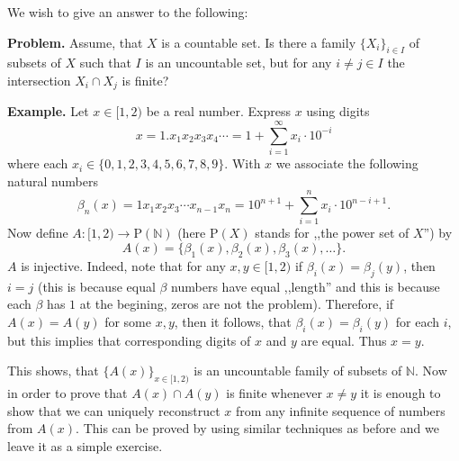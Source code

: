 \documentclass[12pt]{article}
\begin{document}
We wish to give an answer to the following:

\textbf{Problem.} Assume, that $X$ is a countable set. Is there a family $\{X_i\}_{i\in I}$ of subsets of $X$ such that $I$ is an uncountable set, but for any $i\neq j\in I$ the intersection $X_i\cap X_j$ is finite?

\textbf{Example.} Let $x\in [1,2)$ be a real number. Express $x$ using digits
$$x=1.x_1x_2x_3x_4\cdots = 1 + \sum_{i=1}^{\infty}x_i\cdot 10^{-i}$$
where each $x_i\in\{0,1,2,3,4,5,6,7,8,9\}$. With $x$ we associate the following natural numbers
$$\beta_n(x)=1x_1x_2x_3\cdots x_{n-1} x_n=10^{n+1} + \sum_{i=1}^{n}x_{i}\cdot 10^{n-i+1}.$$
Now define $A:[1,2)\to \mathrm{P}(\mathbb{N})$ (here $\mathrm{P}(X)$ stands for ,,the power set of $X$'') by $$A(x)=\{\beta_1(x),\beta_2(x),\beta_3(x),\ldots\}.$$
$A$ is injective. Indeed, note that for any $x,y\in[1,2)$ if $\beta_i(x)=\beta_j(y)$, then $i=j$ (this is because equal $\beta$ numbers have equal ,,length'' and this is because each $\beta$ has $1$ at the begining, zeros are not the problem). Therefore, if $A(x)=A(y)$ for some $x,y$, then it follows, that $\beta_i(x)=\beta_i(y)$ for each $i$, but this implies that corresponding digits of $x$ and $y$ are equal. Thus $x=y$.

This shows, that $\{A(x)\}_{x\in [1,2)}$ is an uncountable family of subsets of $\mathbb{N}$. Now in order to prove that $A(x)\cap A(y)$ is finite whenever $x\neq y$ it is enough to show that we can uniquely reconstruct $x$ from any infinite sequence of numbers from $A(x)$. This can be proved by using similar techniques as before and we leave it as a simple exercise.
\end{document}
